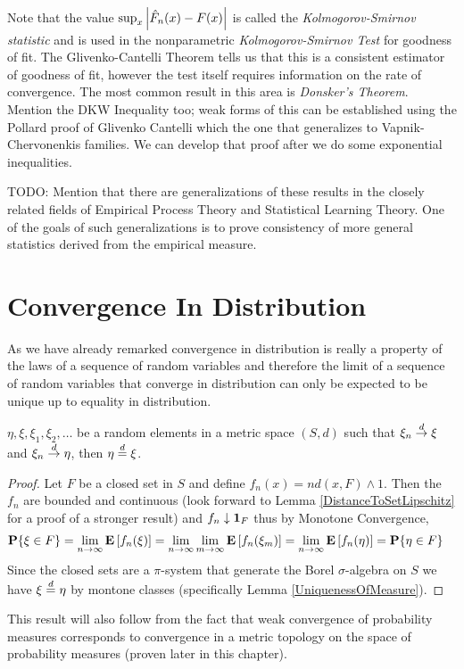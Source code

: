 Note that the value $\sup_x \left \vert \hat{F}_n(x) - F(x) \right \vert$ is called the
\emph{Kolmogorov-Smirnov statistic} and is used in the nonparametric
\emph{Kolmogorov-Smirnov Test} for goodness of fit.  The
Glivenko-Cantelli Theorem tells us that this is a consistent estimator
of goodness of fit, however the test itself requires information on
the rate of convergence.  The most common result in this area is
\emph{Donsker's Theorem}.  Mention the DKW Inequality too; weak forms
of this can be established using the Pollard proof of Glivenko
Cantelli which the one that generalizes to Vapnik-Chervonenkis
families.  We can develop that proof after we do some exponential inequalities.

TODO: Mention that there are generalizations of these results in the
closely related fields of Empirical Process Theory and Statistical
Learning Theory.  One of the goals of such generalizations is to prove
consistency of more general statistics derived from the empirical measure.

\section{Convergence In Distribution}
As we have already remarked convergence in distribution is really a
property of the laws of a sequence of random variables and therefore
the limit of a sequence of random variables that converge in
distribution can only be expected to be unique up to equality in
distribution.
\begin{lem}\label{UniquenessOfConvergenceInDistribution}$\eta, \xi, \xi_1, \xi_2, \dots$ be a random elements in a
  metric space $(S,d)$ such that $\xi_n \overset{d}\to \xi$ and $\xi_n
  \overset{d}\to \eta$, then $\eta \overset{d}= \xi$.
\end{lem}
\begin{proof}
Let $F$ be a closed set in $S$ and define $f_n(x) = nd(x,F) \wedge
1$.  Then the $f_n$ are bounded and continuous (look forward to Lemma
\ref{DistanceToSetLipschitz} for a proof of a stronger result) and
$f_n \downarrow \textbf{1}_{F}$ thus by Monotone Convergence,
\begin{align*}
\textbf{P}\{\xi \in F\} &= \lim_{n \to \infty} \textbf{E}\left[f_n(\xi)\right]=
\lim_{n \to \infty} \lim_{m \to \infty} \textbf{E}\left[f_n(\xi_m)\right] =  \lim_{n \to \infty} \textbf{E}\left[f_n(\eta)\right]=\textbf{P}\{\eta \in F\} 
\end{align*}
Since the closed sets are a $\pi$-system that generate the Borel
$\sigma$-algebra on $S$ we have $\xi \overset{d}= \eta$ by montone classes
(specifically Lemma \ref{UniquenessOfMeasure}).
\end{proof}
This result will also follow from the fact that weak convergence of
probability measures corresponds to convergence in a metric topology on the space
of probability measures (proven later in this chapter).

